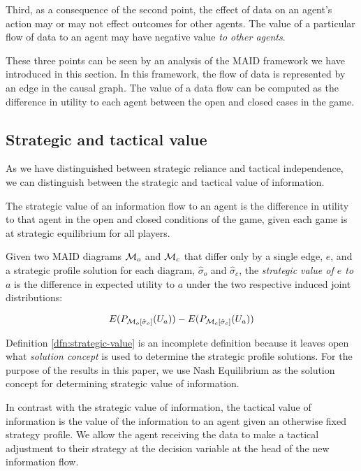 \documentclass[../thesis.tex]{subfiles}
\begin{document}
Third, as a consequence of the second point,
the effect of data on an agent's action may or may
not effect outcomes for other agents.
The value of a particular flow of data to an agent
may have negative value \emph{to other agents}.

These three points can be seen by an analysis of the MAID
framework we have introduced in this section.
In this framework, the flow of data is represented by
an edge in the causal graph.
The value of a data flow can be computed as the difference
in utility to each agent between the open and closed cases
in the game.

\subsection{Strategic and tactical value}

As we have distinguished between strategic reliance and
tactical independence, we can distinguish between the
strategic and tactical value of information.

The strategic value of an information flow to an agent
is the difference in utility to that agent in the open
and closed conditions of the game, given each game
is at strategic equilibrium for all players.

\begin{dfn}
  \label{dfn:strategic-value}
  Given two MAID diagrams $\mathcal{M}_{o}$ and $\mathcal{M}_{c}$
  that differ only by a single edge, $e$,
  and a strategic profile solution for each diagram, $\hat{\sigma}_{o}$
  and $\hat{\sigma}_{c}$, the \emph{strategic value of $e$ to $a$}
  is the difference in expected utility to $a$ under the
  two respective induced joint distributions:

  $$E(P_{\mathcal{M}_{o}[\hat{\sigma}_{o}]}(U_a)) - E(P_{\mathcal{M}_{c}[\hat{\sigma}_{c}]}(U_a))$$
\end{dfn}

Definition \ref{dfn:strategic-value} is an incomplete
definition because it leaves open what \textit{solution concept}
is used to determine the strategic profile solutions.
For the purpose of the results in this paper, we use
Nash Equilibrium as the solution concept for determining
strategic value of information.

In contrast with the strategic value of information,
the tactical value of information is the value of
the information to an agent given an otherwise fixed
strategy profile.
We allow the agent receiving the data to make a tactical
adjustment to their strategy at the decision variable
at the head of the new information flow.
\end{document}
